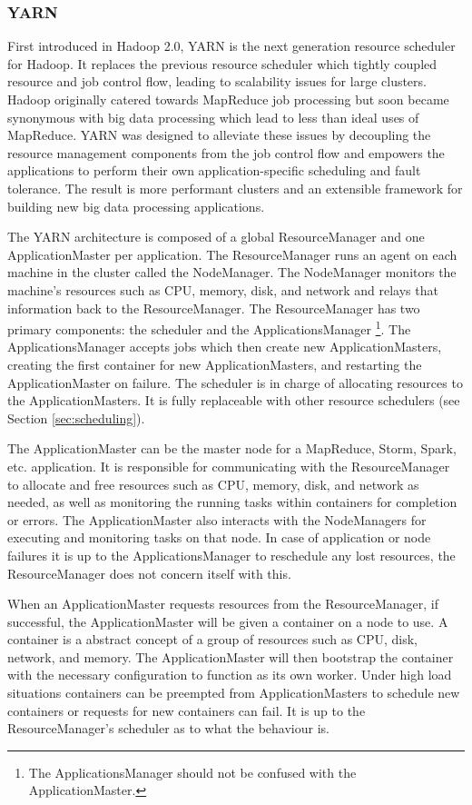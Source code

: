 \documentclass[12pt]{article}
\begin{document}
\subsubsection{YARN}

First introduced in Hadoop 2.0, YARN \cite{yarn} is the next generation resource scheduler for Hadoop. It replaces the previous resource scheduler which tightly coupled resource and job control flow, leading to scalability issues for large clusters. Hadoop originally catered towards MapReduce job processing but soon became synonymous with big data processing which lead to less than ideal uses of MapReduce. YARN was designed to alleviate these issues by decoupling the resource management components from the job control flow and empowers the applications to perform their own application-specific scheduling and fault tolerance. The result is more performant clusters and an extensible framework for building new big data processing applications.

The YARN architecture \cite{yarnarchitecture} is composed of a global ResourceManager and one ApplicationMaster per application. The ResourceManager runs an agent on each machine in the cluster called the NodeManager. The NodeManager monitors the machine's resources such as CPU, memory, disk, and network and relays that information back to the ResourceManager. The ResourceManager has two primary components: the scheduler and the ApplicationsManager \footnote{The ApplicationsManager should not be confused with the ApplicationMaster.}. The ApplicationsManager accepts jobs which then create new ApplicationMasters, creating the first container for new ApplicationMasters, and restarting the ApplicationMaster on failure. The scheduler is in charge of allocating resources to the ApplicationMasters. It is fully replaceable with other resource schedulers (see Section \ref{sec:scheduling}).

The ApplicationMaster can be the master node for a MapReduce, Storm, Spark, etc. application. It is responsible for communicating with the ResourceManager to allocate and free resources such as CPU, memory, disk, and network as needed, as well as monitoring the running tasks within containers for completion or errors. The ApplicationMaster also interacts with the NodeManagers for executing and monitoring tasks on that node. In case of application or node failures it is up to the ApplicationsManager to reschedule any lost resources, the ResourceManager does not concern itself with this.

When an ApplicationMaster requests resources from the ResourceManager, if successful, the ApplicationMaster will be given a container on a node to use. A container is a abstract concept of a group of resources such as CPU, disk, network, and memory. The ApplicationMaster will then bootstrap the container with the necessary configuration to function as its own worker. Under high load situations containers can be preempted from ApplicationMasters to schedule new containers or requests for new containers can fail. It is up to the ResourceManager's scheduler as to what the behaviour is.
\end{document}

